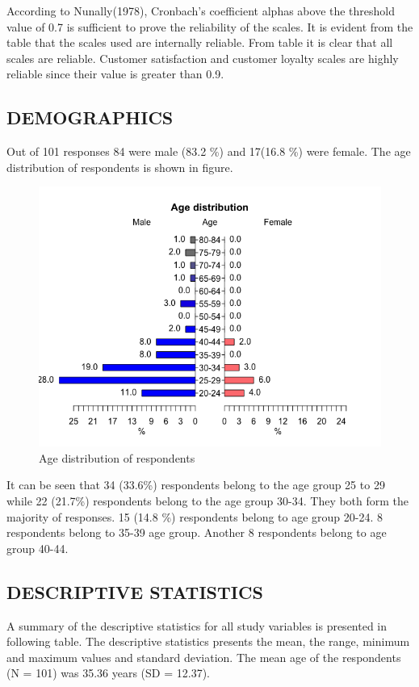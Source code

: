 \documentclass[a4paper, 14pt]{article}
\begin{document}
{\par According to Nunally(1978), Cronbach's coefficient alphas above the threshold value of 0.7 is sufficient to prove the reliability of the scales. It is evident from the table that the scales used are internally reliable. From table it is clear that all scales are reliable. Customer satisfaction and customer loyalty scales are highly reliable since their value is greater than 0.9.

\subsection{DEMOGRAPHICS}
Out of 101 responses 84 were male (83.2 \%) and 17(16.8 \%) were female. The age distribution of respondents is shown in figure.
\begin{figure}[H]
\centering
\includegraphics[scale=0.7]{age.png}
\caption{Age distribution of respondents}
\end{figure}
It can be seen that 34 (33.6\%) respondents belong to the age group 25 to 29 while 22 (21.7\%) respondents belong to the age group 30-34. They both form the majority of responses. 15 (14.8 \%) respondents belong to age group 20-24. 8 respondents belong to 35-39 age group. Another 8 respondents belong to age group 40-44.

\subsection{DESCRIPTIVE STATISTICS}
A summary of the descriptive statistics for all study variables is presented in following table. The descriptive statistics presents the mean, the range, minimum and maximum values and standard deviation. The mean age of the respondents (N = 101) was 35.36 years (SD = 12.37). 

}
\end{document}
